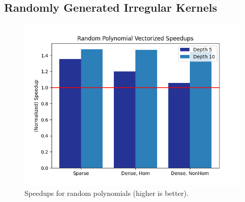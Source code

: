 \subsection{Randomly Generated Irregular Kernels}
\begin{figure}[t]
	\centering
    \includegraphics[width=0.9\linewidth]{figures/graphs/trees.png}
    \caption{Speedups for random polynomials (higher is better).}\label{fig:polynomial-speedups}
\end{figure}

